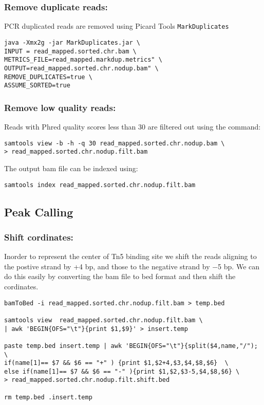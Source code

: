 \documentclass[10pt]{article}
\newcommand{\prog}[1]{\texttt{#1}}
\begin{document}
\subsubsection{Remove duplicate reads:} PCR duplicated reads are removed using Picard Tools \prog{MarkDuplicates}
\begin{verbatim}
java -Xmx2g -jar MarkDuplicates.jar \
INPUT = read_mapped.sorted.chr.bam \
METRICS_FILE=read_mapped.markdup.metrics" \
OUTPUT=read_mapped.sorted.chr.nodup.bam" \
REMOVE_DUPLICATES=true \
ASSUME_SORTED=true
\end{verbatim}
\subsubsection{Remove low quality reads:} Reads with Phred quality scores less than 30 are filtered out using the command:
\begin{verbatim}
samtools view -b -h -q 30 read_mapped.sorted.chr.nodup.bam \
> read_mapped.sorted.chr.nodup.filt.bam
\end{verbatim}
The output bam file can be indexed using:
\begin{verbatim}
samtools index read_mapped.sorted.chr.nodup.filt.bam
\end{verbatim} 
\subsection{Peak Calling}
\subsubsection{Shift cordinates:} Inorder to represent the center of Tn5 binding site we shift the reads aligning to the postive strand by +4 bp, and those to the negative strand by −5 bp. We can do this easily by converting the bam file to bed format and then shift the cordinates.
\begin{verbatim}
bamToBed -i read_mapped.sorted.chr.nodup.filt.bam > temp.bed

samtools view  read_mapped.sorted.chr.nodup.filt.bam \
| awk 'BEGIN{OFS="\t"}{print $1,$9}' > insert.temp

paste temp.bed insert.temp | awk 'BEGIN{OFS="\t"}{split($4,name,"/"); \
if(name[1]== $7 && $6 == "+" ) {print $1,$2+4,$3,$4,$8,$6}  \
else if(name[1]== $7 && $6 == "-" ){print $1,$2,$3-5,$4,$8,$6} \
> read_mapped.sorted.chr.nodup.filt.shift.bed

rm temp.bed .insert.temp
\end{verbatim}
\end{document}
